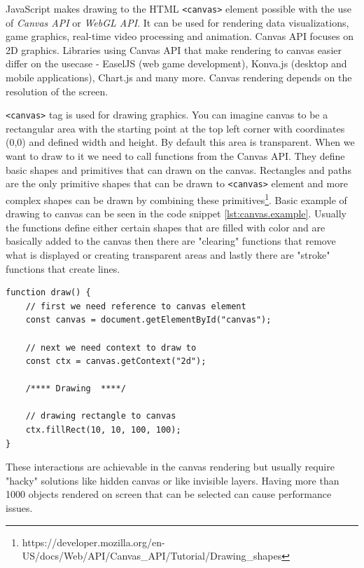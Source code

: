 JavaScript makes drawing to the HTML \verb|<canvas>| element possible with the use of \textit{Canvas API} or \textit{WebGL API}. It can be used for rendering data visualizations, game graphics, real-time video processing and animation. Canvas API focuses on 2D graphics. Libraries using Canvas API that make rendering to canvas easier differ on the usecase - EaselJS (web game development), Konva.js (desktop and mobile applications), Chart.js and many more. Canvas rendering depends on the resolution of the screen. 

\verb|<canvas>| tag is used for drawing graphics. You can imagine canvas to be a rectangular area with the starting point at the top left corner with coordinates (0,0) and defined width and height. By default this area is transparent. When we want to draw to it we need to call functions from the Canvas API. They define basic shapes and primitives that can drawn on the canvas. Rectangles and paths are the only primitive shapes that can be drawn to \verb|<canvas>| element and more complex shapes can be drawn by combining these primitives\footnote{https://developer.mozilla.org/en-US/docs/Web/API/Canvas\_API/Tutorial/Drawing\_shapes}. Basic example of drawing to canvas can be seen in the code snippet \ref{lst:canvas.example}. Usually the functions define either certain shapes that are filled with color and are basically added to the canvas then there are "clearing" functions that remove what is displayed or creating transparent areas and lastly there are "stroke" functions that create lines. 

\begin{lstlisting}[frame=single,numbers=right,caption={An example implementation of drawing to canvas.},label=lst:canvas.example,basicstyle=\ttfamily\small, keywordstyle=\color{black}\bfseries\underbar,]
function draw() {
    // first we need reference to canvas element
    const canvas = document.getElementById("canvas");

    // next we need context to draw to
    const ctx = canvas.getContext("2d");

    /**** Drawing  ****/
    
    // drawing rectangle to canvas
    ctx.fillRect(10, 10, 100, 100);
}
\end{lstlisting}








These interactions are achievable in the canvas rendering but usually require "hacky" solutions like hidden canvas or like invisible layers. Having more than 1000 objects rendered on screen that can be selected can cause performance issues.

